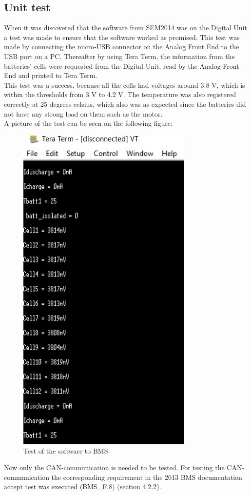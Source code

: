 \subsection{Unit test}
When it was discovered that the software from SEM2014 was on the Digital Unit a test was made to ensure that the software worked as promised. This test was made by connecting the micro-USB connector on the Analog Front End to the USB port on a PC. Thereafter by using Tera Term, the information from the batteries' cells were requested from the Digital Unit, read by the Analog Front End and printed to Tera Term.\\ 
This test was a success, because all the cells had voltages around 3.8 V, which is within the thresholds from 3 V to 4.2 V. The temperature was also registered correctly at 25 degrees celsius, which also was as expected since the batteries did not have any strong load on them such as the motor.\\
A picture of the test can be seen on the following figure:\\
\begin{figure}[H]
	\centering
	\includegraphics[width=0.5\linewidth]{Software/BMS_teraterm_test.PNG}
	\caption{Test of the software to BMS}
	\label{fig:SoftwareTest_teraterm_BMS}
\end{figure}

Now only the CAN-communication is needed to be tested. For testing the CAN-communication the corresponding requirement in the 2013 BMS documentation accept test was executed (BMS\_F.8) \cite{BMSDocumentation} (section 4.2.2).\\


